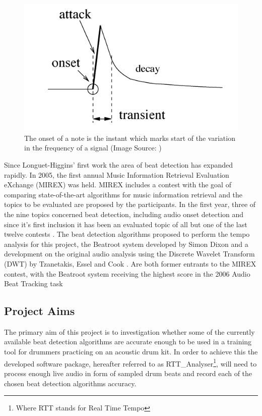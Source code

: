 \documentclass[a4paper, 11pt]{article}
\begin{document}
\begin{figure}[ht]
	\centering
	\includegraphics[scale=0.40]{Onset}
	\caption{The onset of a note is the instant which marks start of the variation in the frequency of a signal (Image Source: \cite{onset-tut})}
	\label{fig: Onset}
\end{figure}

Since Longuet-Higgins' first work the area of beat detection has expanded rapidly. In 2005, the first annual Music Information Retrieval Evaluation eXchange (MIREX) was held. MIREX includes a contest with the goal of comparing state-of-the-art algorithms for music information retrieval \cite{mirex-main} and the topics to be evaluated are proposed by the participants. In the first year, three of the nine topics concerned beat detection, including audio onset detection and since it's first inclusion it has been an evaluated topic of all but one of the last twelve contests \cite{mirex-onset}. The beat detection algorithms proposed to perform the tempo analysis for this project, the Beatroot system developed by Simon Dixon \cite{dixon1} and a development on the original audio analysis using the Discrete Wavelet Transform (DWT) by Tzanetakis, Essel and Cook \cite{tzane1}. Are both former entrants to the MIREX contest, with the Beatroot system receiving the highest score in the 2006 Audio Beat Tracking task \cite{mirex-06} 

\subsection{Project Aims}
The primary aim of this project is to investigation whether some of the currently available beat detection algorithms are accurate enough to be used in a training tool for drummers practicing on an acoustic drum kit. In order to achieve this the developed software package, hereafter referred to as  RTT\_Analyser\footnote{Where RTT stands for Real Time Tempo}, will need to process enough live audio in form of sampled drum beats and record each of the chosen beat detection algorithms accuracy. 
\end{document}

